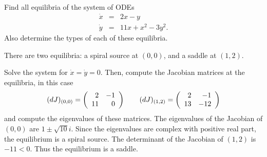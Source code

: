\documentclass{ximera}
\begin{document}
\begin{exercise} \label{c8.2.8}
Find all equilibria of the system of ODEs
\begin{eqnarray*}
\dot{x} & = & 2x - y \\
\dot{y} & = & 11x + x^2 - 3y^2.
\end{eqnarray*}
Also determine the types of each of these equilibria.

\begin{solution}

\ans There are two equilibria: a spiral source at $(0,0)$, and a saddle
at $(1,2)$.

\soln Solve the system for $\dot{x} = \dot{y} = 0$.  Then, compute the
Jacobian matrices at the equilibria, in this case
\[
(dJ)_{(0,0)} = \left(\begin{array}{rr} 2 & -1\\ 11 &0\end{array}\right) \qquad
(dJ)_{(1,2)} = \left(\begin{array}{rr} 2 & -1\\ 13 &-12\end{array}\right)
\]
and compute the eigenvalues of these matrices.  The eigenvalues of the
Jacobian of $(0,0)$ are $1 \pm \sqrt{10}i$.  Since the eigenvalues
are complex with positive real part, the equilibrium is
a spiral source.  The determinant of the Jacobian of $(1,2)$ is
$-11 < 0$.  Thus the equilibrium is a saddle.

\end{solution}
\end{exercise}
\end{document}
